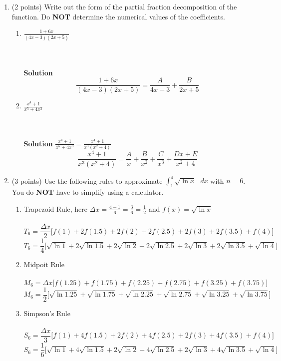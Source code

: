 \documentclass[paper=a4, fontsize=11pt]{scrartcl} %
\numberwithin{equation}{section} %
\numberwithin{figure}{section} %
\numberwithin{table}{section} %
\begin{document}
\begin{enumerate}
\item (2 points) Write out the form of the partial fraction decomposition of the function.  Do \textbf{NOT} determine the numerical values of the coefficients. 
\begin{enumerate}
\item \begin{large}$\frac{1+6x}{(4x-3)(2x+5)}$\end{large}\\\\
\textbf{Solution}
\begin{equation}
\frac{1+6x}{(4x-3)(2x+5)}=\frac{A}{4x-3}+\frac{B}{2x+5}
\end{equation}
\item \begin{large}$\frac{x^4+1}{x^5+4x^3}$\end{large}\\\\
\textbf{Solution} $\frac{x^4+1}{x^5+4x^3}=\frac{x^4+1}{x^3(x^2+4)}$
\begin{equation}
\frac{x^4+1}{x^3(x^2+4)}=\frac{A}{x}+\frac{B}{x^2}+\frac{C}{x^3}+\frac{Dx+E}{x^2+4}
\end{equation}
\end{enumerate}
\item (3 points) Use the following rules to approximate \large$\int_1^4 \sqrt{\ln x} \text{ } dx$\normalsize\text{  } with $n=6$.  You do \textbf{NOT} have to simplify using a calculator.\\
\begin{enumerate}
\item Trapezoid Rule, here $\Delta x=\frac{4-1}{6}=\frac{3}{6}=\frac{1}{2}$ and $f(x)=\sqrt{\ln x}$\\\\
$$T_6=\frac{\Delta x}{2}\big[f(1)+2f(1.5)+2f(2)+2f(2.5)+2f(3)+2f(3.5)+f(4)\big]$$
$$T_6=\frac{1}{4}\big[\sqrt{\ln 1}+2\sqrt{\ln 1.5}+2\sqrt{\ln 2}+2\sqrt{\ln 2.5}+2\sqrt{\ln 3}+2\sqrt{\ln 3.5}+\sqrt{\ln 4}\big]$$
\item Midpoit Rule\\\\
$$M_6=\Delta x\big[f(1.25)+f(1.75)+f(2.25)+f(2.75)+f(3.25)+f(3.75)\big]$$
$$M_6=\frac12\big[ \sqrt{\ln 1.25}+\sqrt{\ln 1.75}+\sqrt{\ln 2.25}+\sqrt{\ln 2.75}+\sqrt{\ln 3.25}+\sqrt{\ln 3.75} \big]$$
\item Simpson's Rule\\\\
$$S_6=\frac{\Delta x}{3}\big[f(1)+4f(1.5)+2f(2)+4f(2.5)+2f(3)+4f(3.5)+f(4)\big]$$
$$S_6=\frac16\big[\sqrt{\ln 1}+4\sqrt{\ln 1.5}+2\sqrt{\ln 2}+4\sqrt{\ln 2.5}+2\sqrt{\ln 3}+4\sqrt{\ln 3.5}+\sqrt{\ln 4}\big]$$
\end{enumerate}
\end{enumerate}

\end{document}
